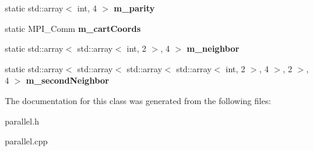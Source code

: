 \begin{DoxyCompactItemize}
\item 
static std\+::array$<$ int, 4 $>$ {\bfseries m\+\_\+parity}\hypertarget{classParallel_a01f36b6b5f23733bb9e5ef537787f6fa}{}\label{classParallel_a01f36b6b5f23733bb9e5ef537787f6fa}

\item 
static M\+P\+I\+\_\+\+Comm {\bfseries m\+\_\+cart\+Coords}\hypertarget{classParallel_a522bd2939de7adbb0413bb14352a4172}{}\label{classParallel_a522bd2939de7adbb0413bb14352a4172}

\item 
static std\+::array$<$ std\+::array$<$ int, 2 $>$, 4 $>$ {\bfseries m\+\_\+neighbor}\hypertarget{classParallel_ac3c55e557814bf2ceff5f0561dfcc2d4}{}\label{classParallel_ac3c55e557814bf2ceff5f0561dfcc2d4}

\item 
static std\+::array$<$ std\+::array$<$ std\+::array$<$ std\+::array$<$ int, 2 $>$, 4 $>$, 2 $>$, 4 $>$ {\bfseries m\+\_\+second\+Neighbor}\hypertarget{classParallel_af69b636eab0ecd9d4a5066b38bfdc979}{}\label{classParallel_af69b636eab0ecd9d4a5066b38bfdc979}

\end{DoxyCompactItemize}


The documentation for this class was generated from the following files\+:\begin{DoxyCompactItemize}
\item 
parallel.\+h\item 
parallel.\+cpp\end{DoxyCompactItemize}
